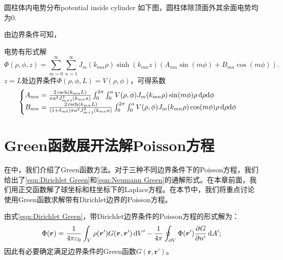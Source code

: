 \begin{example}{圆柱体内电势分布}{potential inside cylinder}
    如下图，圆柱体除顶面外其余面电势均为0.
    \begin{notecaptionblock}
        \label{fig:cylindrical boundary}
    \end{notecaptionblock}
    由边界条件可知，

    电势有形式解
    \[
        \Phi(\rho,\phi,z) = \sum_{m=0}^\infty\sum_{n=1}^\infty J_m(k_{mn}\rho)\sinh(k_{mn}z)(A_{mn}\sin(m\phi) + B_{mn}\cos(m\phi)).
    \]
    $z = L$处边界条件$\Phi(\rho,\phi,L) = V(\rho,\phi)$，可得系数
    \[
        \begin{cases}
            A_{mn} = \frac{2\operatorname{csch}(k_{mn}L)}{\pi a^2J_{m+1}^2(k_{mn}a)}\int_0^{2\pi}\int_0^aV(\rho,\phi)J_m(k_{mn}\rho)\sin(m\phi)\rho\mathop{}\!\mathrm{d}\rho\mathrm{d}\phi\\
            B_{mn} = \frac{2\operatorname{csch}(k_{mn}L)}{(1 + \delta_{m0})\pi a^2J_{m+1}^2(k_{mn}a)}\int_0^{2\pi}\int_0^aV(\rho,\phi)J_m(k_{mn}\rho)\cos(m\phi)\rho\mathop{}\!\mathrm{d}\rho\mathrm{d}\phi
        \end{cases}
    \]
\end{example}

\section{Green函数展开法解Poisson方程}
\label{sec:Green expansion solve Poisson}

在中，我们介绍了Green函数方法。对于三种不同边界条件下的Poisson方程，我们给出了\eqref{eqn:Dirichlet Green}和\eqref{eqn:Neumann Green}的通解形式。在本章前面，我们用正交函数解了球坐标和柱坐标下的Laplace方程。在本节中，我们将重点讨论使用Green函数求解带有Dirichlet边界的Poisson方程。

由式\eqref{eqn:Dirichlet Green}，带Dirichlet边界条件的Poisson方程的形式解为：
\begin{equation}
    \label{eq:ed-dirichlet-potential-representation}
    \Phi(\bm r) = \frac1{4\pi\varepsilon_0}\int_V\rho(\bm r')G(\bm r,\bm r')\mathop{}\!\mathrm{d} V' - \frac1{4\pi}\oint_{\partial V}\Phi(\bm r')\frac{\partial^{}G}{\partial{n'}^{}}\mathop{}\!\mathrm{d} A';
\end{equation}
因此有必要确定满足边界条件的Green函数$G(\bm r,\bm r')$。

